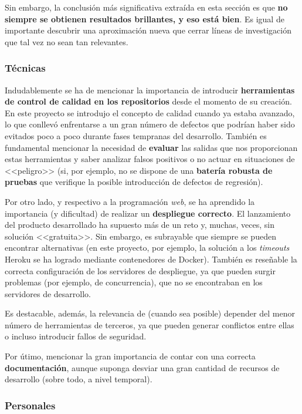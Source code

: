 Sin embargo, la conclusión más significativa extraída en esta sección es que \textbf{no siempre se obtienen resultados brillantes, y eso está bien}. Es igual de importante descubrir una aproximación nueva que cerrar líneas de investigación que tal vez no sean tan relevantes.

\subsubsection{Técnicas}

Indudablemente se ha de mencionar la importancia de introducir \textbf{herramientas de control de calidad en los repositorios} desde el momento de su creación. En este proyecto se introdujo el concepto de calidad cuando ya estaba avanzado, lo que conllevó enfrentarse a un gran número de defectos que podrían haber sido evitados poco a poco durante fases tempranas del desarrollo. También es fundamental mencionar la necesidad de \textbf{evaluar} las salidas que nos proporcionan estas herramientas y saber analizar falsos positivos o no actuar en situaciones de <<peligro>> (si, por ejemplo, no se dispone de una \textbf{batería robusta de pruebas} que verifique la posible introducción de defectos de regresión).

Por otro lado, y respectivo a la programación \textit{web}, se ha aprendido la importancia (y dificultad) de realizar un \textbf{despliegue correcto}. El lanzamiento del producto desarrollado ha supuesto más de un reto y, muchas, veces, sin solución <<gratuita>>. Sin embargo, es subrayable que siempre se pueden encontrar alternativas (en este proyecto, por ejemplo, la solución a los \textit{timeouts} Heroku se ha logrado mediante contenedores de Docker). También es reseñable la correcta configuración de los servidores de despliegue, ya que pueden surgir problemas (por ejemplo, de concurrencia), que no se encontraban en los servidores de desarrollo.

Es destacable, además, la relevancia de (cuando sea posible) depender del menor número de herramientas de terceros, ya que pueden generar conflictos entre ellas o incluso introducir fallos de seguridad.

Por útimo, mencionar la gran importancia de contar con una correcta \textbf{documentación}, aunque suponga desviar una gran cantidad de recursos de desarrollo (sobre todo, a nivel temporal).

\subsubsection{Personales}

